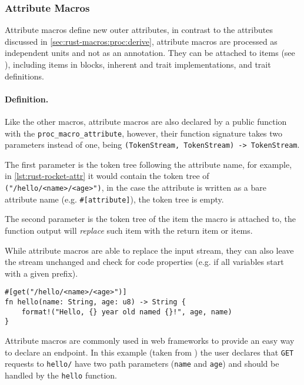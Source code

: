 \subsubsection*{Attribute Macros}\label{sec:rust-macros:proc:attr}
Attribute macros define new outer attributes,
in contrast to the attributes discussed in \autoref{sec:rust-macros:proc:derive},
attribute macros are processed as independent units and not as an annotation.
They can be attached to items (see \autocite[Section 6]{RustRef2021}),
including items in  blocks, inherent and trait implementations, and trait definitions.

\paragraph{Definition.}
Like the other macros, attribute macros are also declared by a public function with the \texttt{proc\_macro\_attribute},
however, their function signature takes two parameters instead of one, being \texttt{(TokenStream, TokenStream) -> TokenStream}.

The first parameter is the token tree following the attribute name, for example, in \autoref{lst:rust-rocket-attr}
it would contain the token tree of \texttt{("/hello/<name>/<age>")},
in the case the attribute is written as a bare attribute name (e.g. \texttt{\#[attribute]}),
the token tree is empty.

The second parameter is the token tree of the item the macro is attached to,
the function output will \emph{replace} such item with the return item or items.

While attribute macros are able to replace the input stream,
they can also leave the stream unchanged and check for code properties (e.g. if all variables start with a given prefix).

\begin{listing}
    \centering
    \begin{verbatim}
#[get("/hello/<name>/<age>")]
fn hello(name: String, age: u8) -> String {
    format!("Hello, {} year old named {}!", age, name)
}
    \end{verbatim}
    \caption{
        Attribute macros are commonly used in web frameworks to provide an easy way to declare an endpoint.
        In this example (taken from \autocite{Rocket2021}) the user declares that \texttt{GET} requests to \texttt{hello/}
        have two path parameters (\texttt{name} and \texttt{age}) and should be handled by the \texttt{hello} function.
    }
    \label{lst:rust-rocket-attr}
\end{listing}

